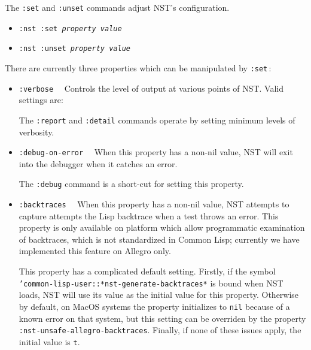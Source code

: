 The \texttt{:set} and \texttt{:unset} commands adjust NST's
configuration.
\begin{itemize}
\item\texttt{:nst :set {\itshape property} {\itshape value}}
\item\texttt{:nst :unset {\itshape property} {\itshape value}}
\end{itemize}
There are currently three properties which can be manipulated by
\texttt{:set}\,:
\begin{itemize}
\item\texttt{:verbose}~~ Controls the
  level of output at various points of NST.  Valid settings are:

  The \texttt{:report} and \texttt{:detail} commands operate by
  setting minimum levels of verbosity.

\item\texttt{:debug-on-error}~~
  When this property has a non-nil value, NST will exit into the
  debugger when it catches an error.

  The \texttt{:debug} command is a short-cut for setting this
  property.

\item\texttt{:backtraces}~~
  When this property has a non-nil value, NST attempts to capture
  attempts the Lisp backtrace when a test throws an error.  This
  property is only available on platform which allow programmatic
  examination of backtraces, which is not standardized in Common Lisp;
  currently we have implemented this feature on Allegro only.

  This property has a complicated default setting.  Firstly, if the
  symbol \texttt{'common-lisp-user::*nst-generate-backtraces*} is
  bound when NST loads, NST will use its value as the initial value
  for this property.  Otherwise by default, on MacOS systems the
  property initializes to \texttt{nil} because of a known error on
  that system, but this setting can be overriden by the property
  \texttt{:nst-unsafe-allegro-backtraces}.  Finally, if none of these
  issues apply, the initial value is \texttt t.
\end{itemize}

